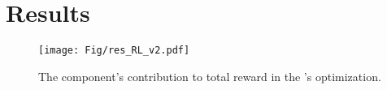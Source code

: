\section{Results}


\begin{figure*}[t]
\centering
\texttt{[image: Fig/res\_RL\_v2.pdf]}
\vspace{-0.3cm}
\caption{The component's contribution to total reward in the {\tool}'s optimization.}
\label{fig:rl_learning_steps}
\vspace{-0.4cm}
\end{figure*}







